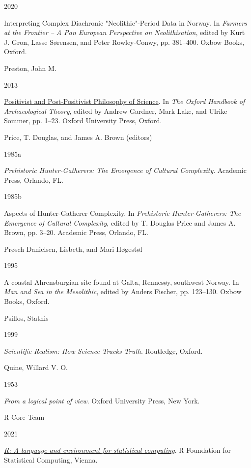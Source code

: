 \documentclass[
  12pt,
  a4paper,
  oneside]{book}
\newlength{\cslhangindent}
\newlength{\csllabelwidth}
\newlength{\cslentryspacingunit} %
\newenvironment{CSLReferences}[2] %
 {%
  \setlength{\parindent}{0pt}
  \ifodd #1
  \let\oldpar\par
  \def\par{\hangindent=\cslhangindent\oldpar}
  \fi
  \setlength{\parskip}{#2\cslentryspacingunit}
 }%
 {}
\newcommand{\CSLBlock}[1]{#1\hfill\break}
\newcommand{\CSLLeftMargin}[1]{\parbox[t]{\csllabelwidth}{#1}}
\newcommand{\CSLRightInline}[1]{\parbox[t]{\linewidth - \csllabelwidth}{#1}\break}
\begin{document}
\begin{CSLReferences}{0}{0}
\leavevmode{}%
\CSLLeftMargin{ 2020 }%
\CSLRightInline{{Interpreting Complex Diachronic {"}Neolithic{"}-Period Data in Norway}. In \emph{{Farmers at the Frontier -- A Pan European Perspective on Neolithisation}}, edited by Kurt J. Gron, Lasse Sørensen, and Peter Rowley-Conwy, pp. 381--400. Oxbow Books, Oxford.}

\leavevmode{}%
\CSLBlock{Preston, John M.}
\CSLLeftMargin{ 2013}%
\CSLRightInline{\href{https://doi.org/10.1093/oxfordhb/9780199567942.013.031}{{Positivist and Post-Positivist Philosophy of Science}}. In \emph{{The Oxford Handbook of Archaeological Theory}}, edited by Andrew Gardner, Mark Lake, and Ulrike Sommer, pp. 1--23. Oxford University Press, Oxford.}

\leavevmode{}%
\CSLBlock{Price, T. Douglas, and James A. Brown (editors)}
\CSLLeftMargin{ 1985a}%
\CSLRightInline{\emph{{Prehistoric Hunter-Gatherers: The Emergence of Cultural Complexity}}. Academic Press, Orlando, FL.}

\leavevmode{}%
\CSLLeftMargin{ 1985b }%
\CSLRightInline{{Aspects of Hunter-Gatherer Complexity}. In \emph{{Prehistoric Hunter-Gatherers: The Emergence of Cultural Complexity}}, edited by T. Douglas Price and James A. Brown, pp. 3--20. Academic Press, Orlando, FL.}

\leavevmode{}%
\CSLBlock{Prøsch-Danielsen, Lisbeth, and Mari Høgestøl}
\CSLLeftMargin{ 1995}%
\CSLRightInline{{A coastal Ahrensburgian site found at Galta, Rennesøy, southwest Norway}. In \emph{{Man and Sea in the Mesolithic}}, edited by Anders Fischer, pp. 123--130. Oxbow Books, Oxford.}

\leavevmode{}%
\CSLBlock{Psillos, Stathis}
\CSLLeftMargin{ 1999}%
\CSLRightInline{\emph{{Scientific Realism: How Science Tracks Truth}}. Routledge, Oxford.}

\leavevmode{}%
\CSLBlock{Quine, Willard V. O.}
\CSLLeftMargin{ 1953}%
\CSLRightInline{\emph{{From a logical point of view}}. Oxford University Press, New York.}

\leavevmode{}%
\CSLBlock{R Core Team}
\CSLLeftMargin{ 2021}%
\CSLRightInline{\emph{\href{https://www.R-project.org/}{R: A language and environment for statistical computing}}. R Foundation for Statistical Computing, Vienna.}


\end{CSLReferences}
\end{document}
